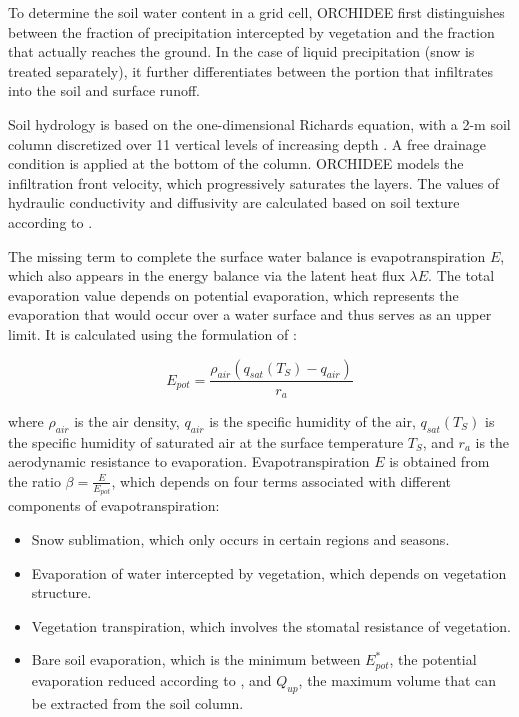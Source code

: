 To determine the soil water content in a grid cell, ORCHIDEE first distinguishes between the fraction of precipitation intercepted by vegetation and the fraction that actually reaches the ground. In the case of liquid precipitation (snow is treated separately), it further differentiates between the portion that infiltrates into the soil and surface runoff.  

Soil hydrology is based on the one-dimensional Richards equation, with a 2-m soil column discretized over 11 vertical levels of increasing depth \cite{de_rosnay_impact_2002, dorgeval_sensitivity_2008}. A free drainage condition is applied at the bottom of the column. ORCHIDEE models the infiltration front velocity, which progressively saturates the layers. The values of hydraulic conductivity and diffusivity are calculated based on soil texture according to \cite{mualem_new_1976, van_genuchten_closed-form_1980}.

The missing term to complete the surface water balance is evapotranspiration $E$, which also appears in the energy balance via the latent heat flux $\lambda E$. The total evaporation value depends on potential evaporation, which represents the evaporation that would occur over a water surface and thus serves as an upper limit. It is calculated using the formulation of \cite{Budyko_1956}:  

\begin{equation}
    E_{pot} = \frac{\rho_{air} (q_{sat}(T_S) - q_{air})}{r_a}
\end{equation}

where $\rho_{air}$ is the air density, $q_{air}$ is the specific humidity of the air, $q_{sat}(T_S)$ is the specific humidity of saturated air at the surface temperature $T_S$, and $r_a$ is the aerodynamic resistance to evaporation.  
Evapotranspiration $E$ is obtained from the ratio $\beta = \frac{E}{E_{pot}}$, which depends on four terms associated with different components of evapotranspiration:  

\begin{itemize}
    \item Snow sublimation, which only occurs in certain regions and seasons.  
    \item Evaporation of water intercepted by vegetation, which depends on vegetation structure.
    \item Vegetation transpiration, which involves the stomatal resistance of vegetation.  
    \item Bare soil evaporation, which is the minimum between $E_{pot}^*$, the potential evaporation reduced according to \cite{milly_potential_1992}, and $Q_{up}$, the maximum volume that can be extracted from the soil column.  
\end{itemize}

